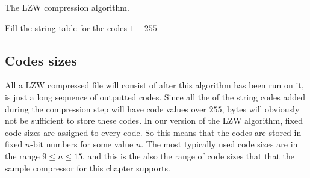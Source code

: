 \begin{algorithm}[H]
  \caption{The LZW compression algorithm.}
  \label{alg:lzw-compression}
  \begin{algorithmic}[1]


    \State Fill the string table for the codes $1-255$
     

    \While{\neof}

       \label{algl:hasingcheckintable}

      \Else

        \State {}

          

          \State {}\label{algl:hashadd}

        \EndIf


      \EndIf


    \EndWhile

    \State {}
    \State {}
    \State {}  \label{algl:flush}
  \end{algorithmic}
\end{algorithm}

\subsection{Codes sizes}

All a LZW compressed file will consist of after this algorithm has
been run on it, is just a long sequence of outputted codes.  Since all
the of the string codes added during the compression step will have
code values over $255$, bytes will obviously not be sufficient to
store these codes. In our version of the LZW algorithm, fixed code
sizes are assigned to every code. So this means that the codes are
stored in fixed $n$-bit numbers for some value $n$. The most typically
used code sizes are in the range $9 \leq n \leq 15$, and this is the
also the range of code sizes that that the sample compressor for this
chapter supports.

